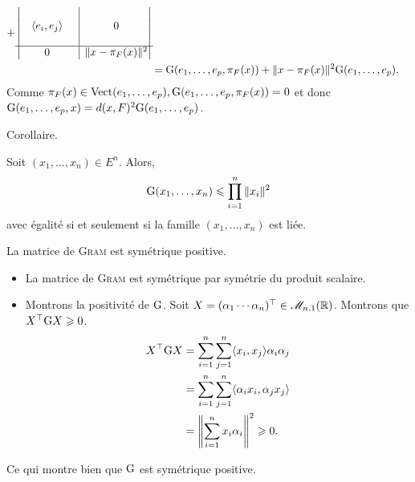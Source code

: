 \begin{preuve}
\begin{align*}
        + 
        \begin{vmatrix}
          \begin{matrix}
            & & \\
            & \langle e_i, e_j \rangle & \\
            & &
          \end{matrix}
          & \rvline & 0 \\
        \hline
          0 & \rvline &
          \begin{matrix}
          \norme{x - \pi_F(x)}^2
          \end{matrix}
        \end{vmatrix} \\
        &= \Gram(e_1, \dots, e_p, \pi_F(x)) + \norme{x - \pi_F(x)}^2 \Gram(e_1, \dots, e_p).
    \end{align*}
    Comme $\pi_F(x) \in \mathrm{Vect}(e_1, \dots, e_p), \mathrm{G}(e_1, \dots, e_p, \pi_F(x)) = 0$ et donc $\mathrm{G}(e_1, \dots, e_p, x) = d(x, F)^2 \mathrm{G}(e_1, \dots, e_p)$.
\end{preuve}

Corollaire.

\begin{corol}
    Soit $(x_1, \dots, x_n) \in E^n$. Alors,
    $$\mathrm{G}(x_1, \dots, x_n) \leqslant \prod_{i=1}^n \Vert x_i \Vert^2$$
    avec égalité si et seulement si la famille $(x_1, \dots, x_n)$ est liée. 
\end{corol}

\begin{preuve}
    
\end{preuve}

\begin{prop}
    La matrice de \textsc{Gram} est symétrique positive.
\end{prop}

\begin{preuve}
    \begin{itemize}
        \item La matrice de \textsc{Gram} est symétrique par symétrie du produit scalaire.
        \item Montrons la positivité de $\mathrm{G}$. Soit $X = (\alpha_1 \cdots \alpha_n)^\top \in \mathscr{M}_{n,1}(\mathbb{R})$. Montrons que $X^\top \mathrm{G} X \geqslant 0$. 
        \begin{align*}
            X^\top \mathrm{G} X &= \sum_{i=1}^{n} \sum_{j=1}^{n} \langle x_i, x_j \rangle \alpha_i \alpha_j \\ 
            &= \sum_{i=1}^{n} \sum_{j=1}^{n} \langle \alpha_i x_i, \alpha_j x_j \rangle \\
            &= \left\Vert \sum_{i=1}^{n}x_i \alpha_i \right\Vert^2 \geqslant 0.
        \end{align*}
    \end{itemize}
   
    Ce qui montre bien que $\mathrm{G}$ est symétrique positive.
\end{preuve}

